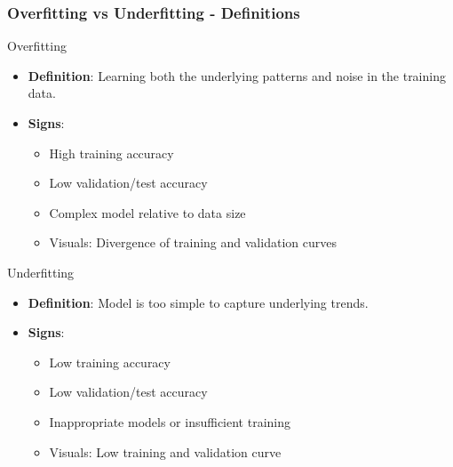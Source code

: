 \documentclass[aspectratio=169]{beamer}
\begin{document}
\begin{frame}[fragile]
    \frametitle{Overfitting vs Underfitting - Definitions}
    \begin{block}{Overfitting}
        \begin{itemize}
            \item \textbf{Definition}: Learning both the underlying patterns and noise in the training data. 
            \item \textbf{Signs}:
                \begin{itemize}
                    \item High training accuracy
                    \item Low validation/test accuracy
                    \item Complex model relative to data size
                    \item Visuals: Divergence of training and validation curves
                \end{itemize}
        \end{itemize}
    \end{block}
    
    \begin{block}{Underfitting}
        \begin{itemize}
            \item \textbf{Definition}: Model is too simple to capture underlying trends.
            \item \textbf{Signs}:
                \begin{itemize}
                    \item Low training accuracy
                    \item Low validation/test accuracy
                    \item Inappropriate models or insufficient training
                    \item Visuals: Low training and validation curve
                \end{itemize}
        \end{itemize}
    \end{block}
\end{frame}
\end{document}
